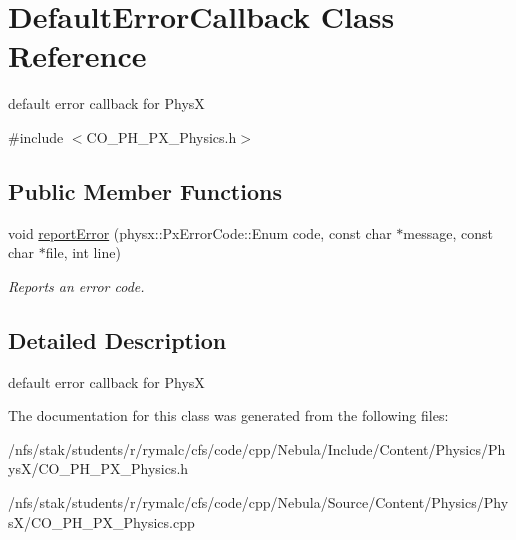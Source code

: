 \hypertarget{classDefaultErrorCallback}{
\section{DefaultErrorCallback Class Reference}
\label{classDefaultErrorCallback}
}


default error callback for PhysX  


{\ttfamily \#include $<$CO\_\-PH\_\-PX\_\-Physics.h$>$}\subsection*{Public Member Functions}
\begin{DoxyCompactItemize}
\item 
\hypertarget{classDefaultErrorCallback_ab2d070f820c2a5451c45fa195bd71c55}{
void \hyperlink{classDefaultErrorCallback_ab2d070f820c2a5451c45fa195bd71c55}{reportError} (physx::PxErrorCode::Enum code, const char $\ast$message, const char $\ast$file, int line)}
\label{classDefaultErrorCallback_ab2d070f820c2a5451c45fa195bd71c55}

\begin{DoxyCompactList}\small\item\em Reports an error code. \item\end{DoxyCompactList}\end{DoxyCompactItemize}


\subsection{Detailed Description}
default error callback for PhysX 

The documentation for this class was generated from the following files:\begin{DoxyCompactItemize}
\item 
/nfs/stak/students/r/rymalc/cfs/code/cpp/Nebula/Include/Content/Physics/PhysX/CO\_\-PH\_\-PX\_\-Physics.h\item 
/nfs/stak/students/r/rymalc/cfs/code/cpp/Nebula/Source/Content/Physics/PhysX/CO\_\-PH\_\-PX\_\-Physics.cpp\end{DoxyCompactItemize}

